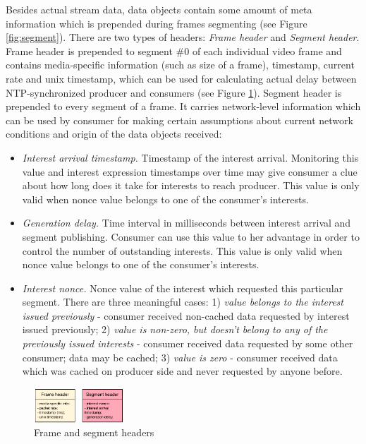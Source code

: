 \documentclass{icn/sig-alternate-2012} %
\begin{document}
Besides actual stream data, data objects contain some amount of meta information which is prepended during frames segmenting (see Figure \ref{fig:segment}). There are two types of headers: \textit{Frame header} and \textit{Segment header}. Frame header is prepended to segment \#0 of each individual video frame and contains media-specific information (such as size of a frame), timestamp, current rate and unix timestamp, which can be used for calculating actual delay between NTP-synchronized producer and consumers (see Figure \ref{fig:data-struct}). Segment header is prepended to every segment of a frame. It carries network-level information which can be used by consumer for making certain assumptions about current network conditions and origin of the data objects received:
\begin{itemize} [label={}]

\item \textit{Interest arrival timestamp.} Timestamp of the interest arrival. Monitoring this value and interest expression timestamps over time may give consumer a clue about how long does it take for interests to reach producer. This value is only valid when nonce value belongs to one of the consumer's interests.

\item \textit{Generation delay.} Time interval in milliseconds between interest arrival and segment publishing. Consumer can use this value to her advantage in order to control the number of outstanding interests. This value is only valid when nonce value belongs to one of the consumer's interests.

\item \textit{Interest nonce.} Nonce value of the interest which requested this particular segment. There are three meaningful cases:  1) \textit{value belongs to the interest issued previously} - consumer received non-cached data requested by interest issued previously; 2) \textit{value is non-zero, but doesn't belong to any of the previously issued interests} - consumer received data requested by some other consumer; data may be cached; 3) \textit{value is zero} - consumer received data which was cached on producer side and never requested by anyone before.

\end{itemize}

\begin{figure}[t!]
\centering
\includegraphics[width=0.3\textwidth]{data-struct}
\vspace{-4pt}
\caption{Frame and segment headers}
\label{fig:data-struct}
\end{figure}
\end{document}
